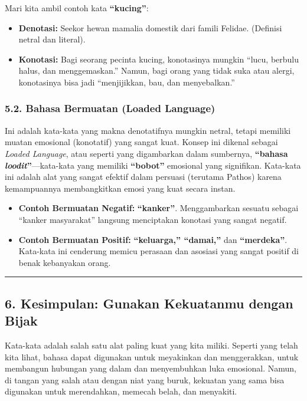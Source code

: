 \documentclass[
  letterpaper,
  DIV=11,
  numbers=noendperiod]{scrreprt}
\begin{document}
Mari kita ambil contoh kata \textbf{``kucing''}:

\begin{itemize}
\item
  \textbf{Denotasi:} Seekor hewan mamalia domestik dari famili Felidae.
  (Definisi netral dan literal).
\item
  \textbf{Konotasi:} Bagi seorang pecinta kucing, konotasinya mungkin
  ``lucu, berbulu halus, dan menggemaskan.'' Namun, bagi orang yang
  tidak suka atau alergi, konotasinya bisa jadi ``menjijikkan, bau, dan
  menyebalkan.''
\end{itemize}

\subsubsection{5.2. Bahasa Bermuatan (Loaded
Language)}\label{bahasa-bermuatan-loaded-language}

Ini adalah kata-kata yang makna denotatifnya mungkin netral, tetapi
memiliki muatan emosional (konotatif) yang sangat kuat. Konsep ini
dikenal sebagai \emph{Loaded Language}, atau seperti yang digambarkan
dalam sumbernya, \textbf{``bahasa \emph{loodit}''}---kata-kata yang
memiliki \textbf{``bobot''} emosional yang signifikan. Kata-kata ini
adalah alat yang sangat efektif dalam persuasi (terutama Pathos) karena
kemampuannya membangkitkan emosi yang kuat secara instan.

\begin{itemize}
\item
  \textbf{Contoh Bermuatan Negatif:} \textbf{``kanker''}. Menggambarkan
  sesuatu sebagai ``kanker masyarakat'' langsung menciptakan konotasi
  yang sangat negatif.
\item
  \textbf{Contoh Bermuatan Positif:} \textbf{``keluarga,'' ``damai,''}
  dan \textbf{``merdeka''}. Kata-kata ini cenderung memicu perasaan dan
  asosiasi yang sangat positif di benak kebanyakan orang.
\end{itemize}

\begin{center}\rule{0.5\linewidth}{0.5pt}\end{center}

\subsection{6. Kesimpulan: Gunakan Kekuatanmu dengan
Bijak}\label{kesimpulan-gunakan-kekuatanmu-dengan-bijak}

Kata-kata adalah salah satu alat paling kuat yang kita miliki. Seperti
yang telah kita lihat, bahasa dapat digunakan untuk meyakinkan dan
menggerakkan, untuk membangun hubungan yang dalam dan menyembuhkan luka
emosional. Namun, di tangan yang salah atau dengan niat yang buruk,
kekuatan yang sama bisa digunakan untuk merendahkan, memecah belah, dan
menyakiti.
\end{document}

